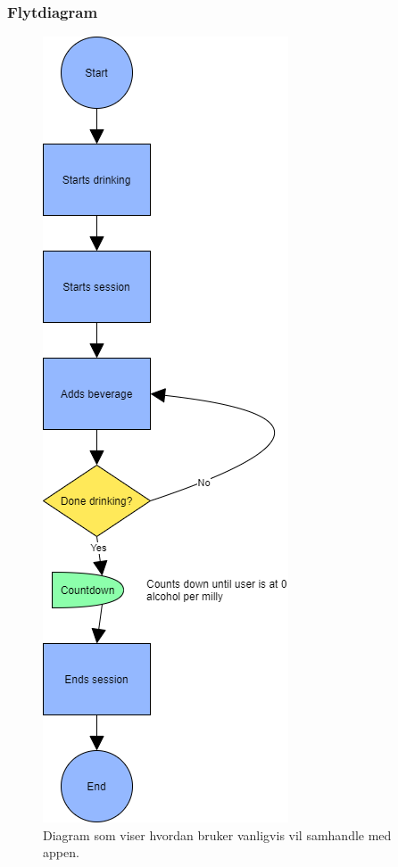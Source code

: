 \subsubsection{Flytdiagram}

\begin{figure}[H]
    \centering
    \includegraphics[scale=0.4]{images/lille_promille_user_float.drawio.png}
    \caption{Diagram som viser hvordan bruker vanligvis vil samhandle med appen.}
\end{figure}